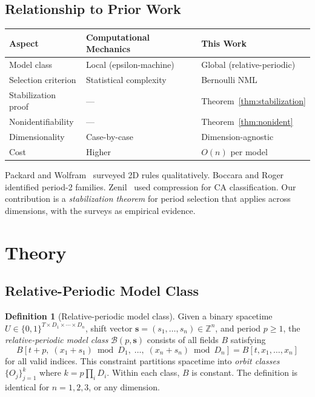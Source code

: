 \documentclass[11pt]{article}
\theoremstyle{definition}
\newtheorem{definition}[theorem]{Definition}
\theoremstyle{remark}
\newcommand{\bs}{\mathbf{s}}
\begin{document}
\subsection{Relationship to Prior Work}

\begin{table}[h]
\centering
\begin{tabular}{lll}
\toprule
Aspect & Computational Mechanics \cite{crutchfield1997,hanson1992,rupe2018} & This Work \\
\midrule
Model class & Local (epsilon-machine) & Global (relative-periodic) \\
Selection criterion & Statistical complexity & Bernoulli NML \\
Stabilization proof & --- & Theorem~\ref{thm:stabilization} \\
Nonidentifiability & --- & Theorem~\ref{thm:nonident} \\
Dimensionality & Case-by-case & Dimension-agnostic \\
Cost & Higher & $O(n)$ per model \\
\bottomrule
\end{tabular}
\end{table}

Packard and Wolfram~\cite{packard1985} surveyed 2D rules qualitatively.
Boccara and Roger~\cite{boccara1999} identified period-2 families.
Zenil~\cite{zenil2010} used compression for CA classification.
Our contribution is a \emph{stabilization theorem} for period selection that applies across dimensions, with the surveys as empirical evidence.

\section{Theory}

\subsection{Relative-Periodic Model Class}

\begin{definition}[Relative-periodic model class]\label{def:model}
Given a binary spacetime $U \in \{0,1\}^{T \times D_1 \times \cdots \times D_n}$, shift vector $\bs = (s_1, \ldots, s_n) \in \mathbb{Z}^n$, and period $p \geq 1$, the \emph{relative-periodic model class} $\mathcal{B}(p, \bs)$ consists of all fields $B$ satisfying
\[
B[t + p,\; (x_1 + s_1) \bmod D_1,\; \ldots,\; (x_n + s_n) \bmod D_n] = B[t, x_1, \ldots, x_n]
\]
for all valid indices.
This constraint partitions spacetime into \emph{orbit classes} $\{O_j\}_{j=1}^{k}$ where $k = p \prod_i D_i$.
Within each class, $B$ is constant.
The definition is identical for $n = 1, 2, 3$, or any dimension.
\end{definition}
\end{document}
